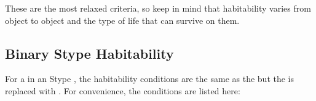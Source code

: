 \documentclass[letterpaper,10pt,english]{sphinxmanual}
\begin{document}
\sphinxAtStartPar
These are the most relaxed criteria, so keep in mind that habitability varies
from object to object and the type of life that can survive on them.


\subsection{Binary S\sphinxhyphen{}type Habitability}
\label{\detokenize{quantities/habitability/binary_s_type_habitability:binary-s-type-habitability}}\label{\detokenize{quantities/habitability/binary_s_type_habitability::doc}}\label{\detokenize{quantities/habitability/binary_s_type_habitability:id1}}
\sphinxAtStartPar
For a {\hyperref[\detokenize{celestial_bodies/star:id1}]{}} in an S\sphinxhyphen{}type {\hyperref[\detokenize{celestial_systems/binary_system:id1}]{}},
the habitability conditions are the same as the {\hyperref[\detokenize{quantities/habitability/single_star_habitability:id1}]{}}
but the {\hyperref[\detokenize{quantities/habitability/habitable_zones/single_star_habitable_zone:id1}]{}} is replaced with {\hyperref[\detokenize{quantities/habitability/habitable_zones/average_habitable_zone:id1}]{}}.
For convenience, the conditions are listed here:
\end{document}
